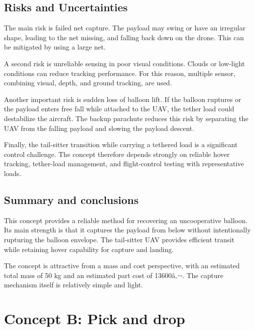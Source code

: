 \subsection{Risks and Uncertainties}
The main risk is failed net capture. The payload may swing or have an irregular shape, leading to the net missing, and falling back down on the drone. This can be mitigated by using a large net. 

A second risk is unreliable sensing in poor visual conditions. Clouds or low-light conditions can reduce tracking performance. For this reason, multiple sensor, combining visual, depth, and ground tracking, are used.

Another important risk is sudden loss of balloon lift. If the balloon ruptures or the payload enters free fall while attached to the UAV, the tether load could destabilize the aircraft. The backup parachute reduces this risk by separating the UAV from the falling payload and slowing the payload descent.

Finally, the tail-sitter transition while carrying a tethered load is a significant control challenge. The concept therefore depends strongly on reliable hover tracking, tether-load management, and flight-control testing with representative loads.

\subsection{Summary and conclusions}
This concept provides a reliable method for recovering an uncooperative balloon. Its main strength is that it captures the payload from below without intentionally rupturing the balloon envelope. The tail-sitter UAV provides efficient transit while retaining hover capability for capture and landing.

The concept is attractive from a mass and cost perspective, with an estimated total mass of 50 kg and an estimated part cost of 13600â‚¬. The capture mechanism itself is relatively simple and light.

\section{Concept B: Pick and drop}

